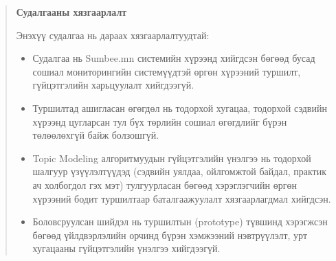 \begin{abstract}
\textbf{Судалгааны хязгаарлалт}

Энэхүү судалгаа нь дараах хязгаарлалтуудтай:
\begin{itemize}
    \item Судалгаа нь Sumbee.mn системийн хүрээнд хийгдсэн бөгөөд бусад сошиал мониторингийн системүүдтэй өргөн хүрээний туршилт, гүйцэтгэлийн харьцуулалт хийгдээгүй.
    \item Туршилтад ашигласан өгөгдөл нь тодорхой хугацаа, тодорхой сэдвийн хүрээнд цугларсан тул бүх төрлийн сошиал өгөгдлийг бүрэн төлөөлөхгүй байж болзошгүй.
    \item Topic Modeling алгоритмуудын гүйцэтгэлийн үнэлгээ нь тодорхой шалгуур үзүүлэлтүүдэд (сэдвийн уялдаа, ойлгомжтой байдал, практик ач холбогдол гэх мэт) тулгуурласан бөгөөд хэрэглэгчийн өргөн хүрээний бодит туршилтаар баталгаажуулалт хязгаарлагдмал хийгдсэн.
    \item Боловсруулсан шийдэл нь туршилтын (prototype) түвшинд хэрэгжсэн бөгөөд үйлдвэрлэлийн орчинд бүрэн хэмжээний нэвтрүүлэлт, урт хугацааны гүйцэтгэлийн үнэлгээ хийгдээгүй.
\end{itemize}
\end{abstract}
